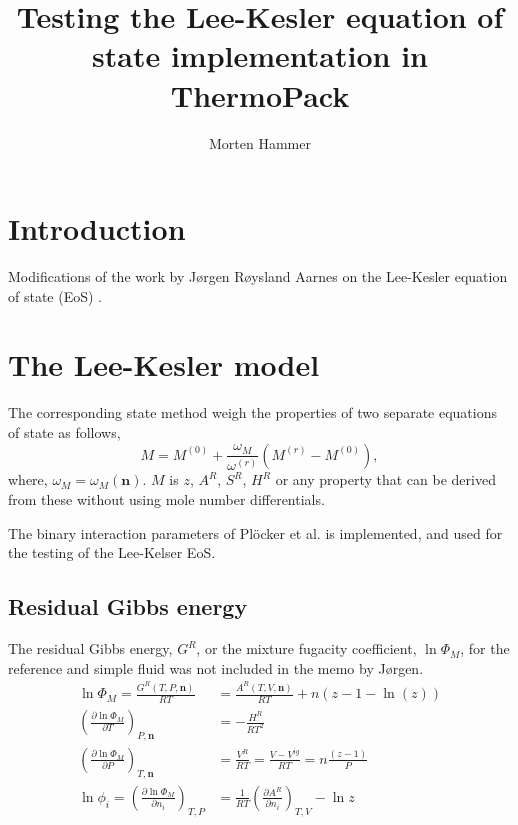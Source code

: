 \documentclass[internal,english]{sintefmemo2012}
\title{Testing the Lee-Kesler equation of state implementation in ThermoPack}
\author{Morten Hammer}
\numberwithin{equation}{section}
\newcommand*{\pder}[2]{\left(\frac{\partial #1}{\partial #2}\right)}
\begin{document}
\frontmatter

\tableofcontents

\section{Introduction}
Modifications of the work by J\o rgen R\o ysland Aarnes on the
Lee-Kesler equation of state (EoS) \cite{LK}. 

\section{The Lee-Kesler model}
The corresponding state method weigh the properties of two separate
equations of state as follows,
\begin{equation}
\label{eq:LK_main}
M = M^{(0)} + \frac{\omega_M}{\omega^{(r)}}(M^{(r)} - M^{(0)}),
\end{equation}
where, $\omega_M=\omega_M(\textbf{n})$. $M$ is $z$, $A^R$, $S^R$,
$H^R$ or any property that can be derived from these without using
mole number differentials.

The binary interaction parameters of Plöcker et al. \cite{PKP} is
implemented, and used for the testing of the Lee-Kelser EoS.

\subsection{Residual Gibbs energy}
The residual Gibbs energy, $G^R$, or the mixture fugacity coefficient,
$\ln \Phi_M$, for the reference and simple fluid was not included in
the memo by J{\o}rgen.
\begin{align}
\label{def:G^R(T,P,n)}
\ln \Phi_M = \frac{G^R(T,P,\textbf{n})}{RT} &= \frac{A^R(T,V,\textbf{n})}{RT} + n\left(z - 1 -
  \ln(z)\right)\\
\pder{\ln \Phi_M}{T}_{P,\textbf{n}} &= -\frac{H^R}{RT^2}\\
\pder{\ln \Phi_M}{P}_{T,\textbf{n}} &= \frac{V^R}{RT} = \frac{V -
  V^{ig}}{RT} = n\frac{\left(z-1\right)}{P}\\
  \ln \phi_i = \pder{\ln \Phi_M}{n_i}_{T,P} & = \frac{1}{RT} \pder{A^R}{n_i}_{T,V} - \ln z\\
\end{align}
\end{document}
